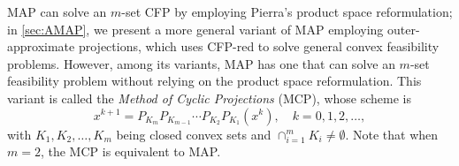 \documentclass[smallextended,numbook,nospthms]{svjour3}
\theoremstyle{plain}
\theoremstyle{definition}
\begin{document}
MAP can solve an $m$-set CFP by employing Pierra's product space reformulation; in \cref{sec:AMAP}, we present a more general variant of MAP employing outer-approximate projections, which uses CFP-red to solve general convex feasibility problems. However, among its variants, MAP has one that can solve an $m$-set feasibility problem without relying on the product space reformulation. This variant is called the \emph{Method of Cyclic Projections} (MCP), whose scheme is
\begin{equation}
	x^{k+1}=P_{K_{m}}P_{K_{m-1}} \cdots P_{K_{2}}P_{K_{1}}\left(x^{k}\right), \quad k=0,1,2, \ldots, \label{eq:MCP}
\end{equation}
with $K_1, K_2, \ldots, K_m$ being closed convex sets and $\cap_{i=1}^{m} K_i \not = \emptyset$. Note that when $m=2$, the MCP is equivalent to MAP.
\end{document}
